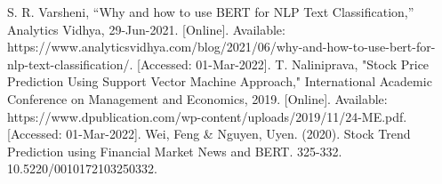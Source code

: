 \documentclass[conference]{IEEEtran}
\begin{document}
\begin{thebibliography}{00}
     S. R. Varsheni, “Why and how to use BERT for NLP Text Classification,” Analytics Vidhya, 29-Jun-2021. [Online]. Available: https://www.analyticsvidhya.com/blog/2021/06/why-and-how-to-use-bert-for-nlp-text-classification/. [Accessed: 01-Mar-2022].
     T. Naliniprava, "Stock Price Prediction Using Support Vector Machine Approach," International Academic Conference on Management and Economics, 2019. [Online]. Available: https://www.dpublication.com/wp-content/uploads/2019/11/24-ME.pdf. [Accessed: 01-Mar-2022].
     Wei, Feng \& Nguyen, Uyen. (2020). Stock Trend Prediction using Financial Market News and BERT. 325-332. 10.5220/0010172103250332.
\end{thebibliography}
\end{document}
